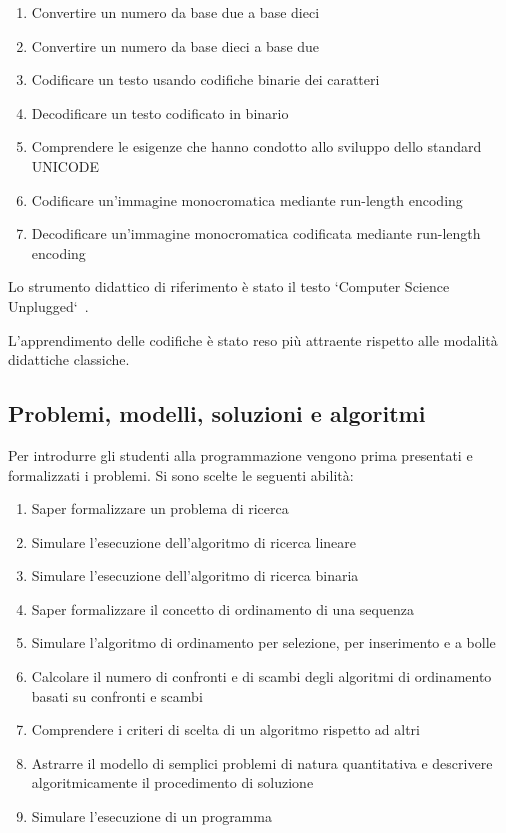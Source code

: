 \documentclass{easychair}
\begin{document}
\begin{enumerate}
  \item
    Convertire un numero da base due a base dieci
  \item
    Convertire un numero da base dieci a base due
  \item
    Codificare un testo usando codifiche binarie dei caratteri
  \item
    Decodificare un testo codificato in binario
  \item
    Comprendere le esigenze che hanno condotto allo sviluppo dello
    standard UNICODE
  \item
    Codificare un'immagine monocromatica mediante run-length encoding
  \item
    Decodificare un'immagine monocromatica codificata mediante run-length
    encoding
\end{enumerate}  

Lo strumento didattico di riferimento è stato il testo
`Computer Science Unplugged`~\cite{csu}.

L'apprendimento delle codifiche è stato reso più attraente rispetto alle modalità
didattiche classiche.

\subsection[Problemi e algoritmi]{Problemi, modelli, soluzioni e algoritmi}

Per introdurre gli studenti alla programmazione vengono prima presentati
e formalizzati i problemi.
Si sono scelte le seguenti abilità:

\begin{enumerate}
  \item
    Saper formalizzare un problema di ricerca
  \item
    Simulare l'esecuzione dell'algoritmo di ricerca lineare
  \item
    Simulare l'esecuzione dell'algoritmo di ricerca binaria
  \item
    Saper formalizzare il concetto di ordinamento di una sequenza
  \item
    Simulare l'algoritmo di ordinamento per selezione, per inserimento e a bolle
  \item
    Calcolare il numero di confronti e di scambi degli algoritmi di
    ordinamento basati su confronti e scambi
  \item
    Comprendere i criteri di scelta di un algoritmo rispetto ad altri
  \item
    Astrarre il modello di semplici problemi di natura quantitativa e
    descrivere algoritmicamente il procedimento di soluzione
  \item
    Simulare l'esecuzione di un programma
\end{enumerate}
  
\end{document}
